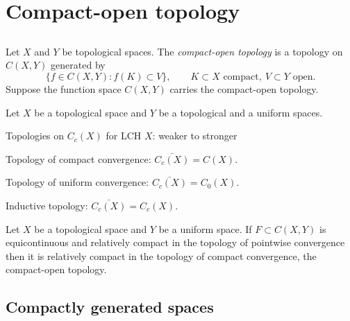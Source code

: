 \documentclass{../../large}
\begin{document}
\chapter{Compact-open topology}

\section{}

\begin{prb}
Let $X$ and $Y$ be topological spaces.
The \emph{compact-open topology} is a topology on $C(X,Y)$ generated by
\[\{f\in C(X,Y):f(K)\subset V\},\qquad K\subset X\text{ compact},\ V\subset Y\text{ open}.\]
Suppose the function space $C(X,Y)$ carries the compact-open topology.
\end{prb}



\begin{prb}
Let $X$ be a topological space and $Y$ be a topological and a uniform spaces.
\end{prb}

Topologies on $C_c(X)$ for LCH $X$: weaker to stronger
\begin{parts}
\item Topology of compact convergence: $\bar{C_c(X)}=C(X)$.
\item Topology of uniform convergence: $\bar{C_c(X)}=C_0(X)$.
\item Inductive topology: $\bar{C_c(X)}=C_c(X)$.
\end{parts}


Let $X$ be a topological space and $Y$ be a uniform space. If $F\subset C(X,Y)$ is equicontinuous and relatively compact in the topology of pointwise convergence then it is relatively compact in the topology of compact convergence, the compact-open topology.

\section{Compactly generated spaces}
\end{document}
